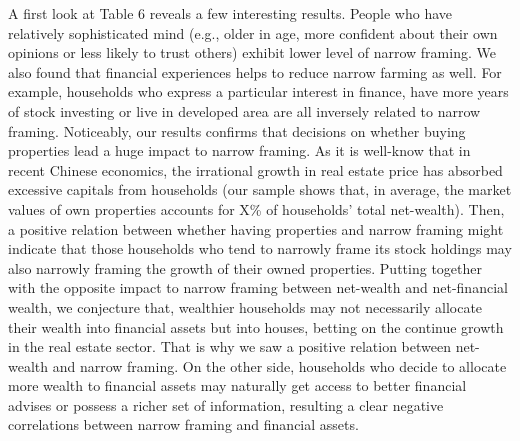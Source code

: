 \documentclass[ukenglish,nottitlepage,thmsb,11pt,letterpaper]{article}
\begin{document}
A first look at Table 6 reveals a few interesting results. People who have relatively sophisticated mind (e.g., older in age, more confident about their own opinions or less likely to trust others) exhibit lower level of narrow framing. We also found that financial experiences helps to reduce narrow farming as well. For example, households who express a particular interest in finance, have more years of stock investing or live in developed area are all inversely related to narrow framing. Noticeably, our results confirms that decisions on whether buying properties lead a huge impact to narrow framing. As it is well-know that in recent Chinese economics, the irrational growth in real estate price has absorbed excessive capitals from households (our sample shows that, in average, the market values of own properties accounts for X\% of households' total net-wealth). Then, a positive relation between whether having properties and narrow framing might indicate that those households who tend to narrowly frame its stock holdings may also narrowly framing the growth of their owned properties. Putting together with the opposite impact to narrow framing between net-wealth and net-financial wealth, we conjecture that, wealthier households may not necessarily allocate their wealth into financial assets but into houses, betting on the continue growth in the real estate sector. That is why we saw a positive relation between net-wealth and narrow framing. On the other side, households who decide to allocate more wealth to financial assets may naturally get access to better financial advises or possess a richer set of information, resulting a clear negative correlations between narrow framing and financial assets.
\end{document}
